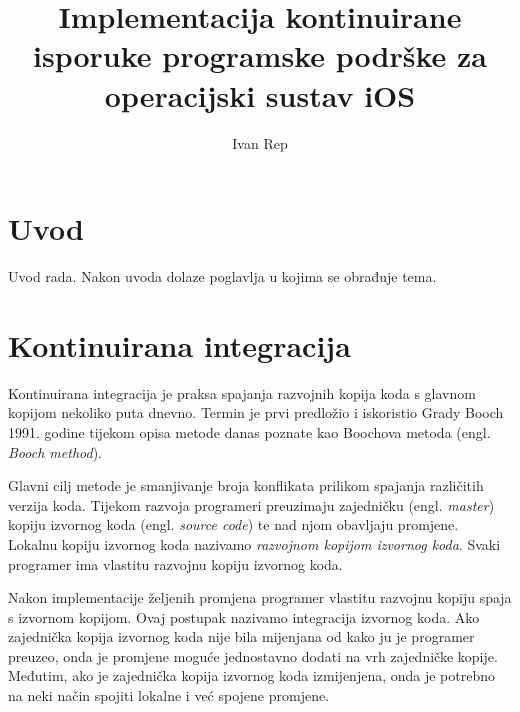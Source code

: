 \documentclass[times, utf8, diplomski, numeric]{fer}
\newcommand{\eng}[1]{(engl. \textit{#1})}
\begin{document}

\title{Implementacija kontinuirane isporuke programske podrške za operacijski sustav iOS}

\author{Ivan Rep}

\maketitle

\izvornik

\zahvala{}

\tableofcontents

\chapter{Uvod}
Uvod rada. Nakon uvoda dolaze poglavlja u kojima se obrađuje tema.



\chapter{Kontinuirana integracija} \label{KontinuiranaIntegracija}

Kontinuirana integracija je praksa spajanja razvojnih kopija koda s glavnom kopijom nekoliko puta dnevno. Termin je prvi predložio i iskoristio Grady Booch 1991. godine tijekom opisa metode danas poznate kao Boochova metoda \eng{Booch method}\citep{wiki:BoochMethod}.

Glavni cilj metode je smanjivanje broja konflikata prilikom spajanja različitih verzija koda. Tijekom razvoja programeri preuzimaju zajedničku \eng{master} kopiju izvornog koda \eng{source code} te nad njom obavljaju promjene. Lokalnu kopiju izvornog koda nazivamo \textit{razvojnom kopijom izvornog koda}. Svaki programer ima vlastitu razvojnu kopiju izvornog koda.

Nakon implementacije željenih promjena programer vlastitu razvojnu kopiju spaja s izvornom kopijom. Ovaj postupak nazivamo integracija izvornog koda. Ako zajednička kopija izvornog koda nije bila mijenjana od kako ju je programer preuzeo, onda je promjene moguće jednostavno dodati na vrh zajedničke kopije. Međutim, ako je zajednička kopija izvornog koda izmijenjena, onda je potrebno na neki način spojiti lokalne i već spojene promjene.
\end{document}
